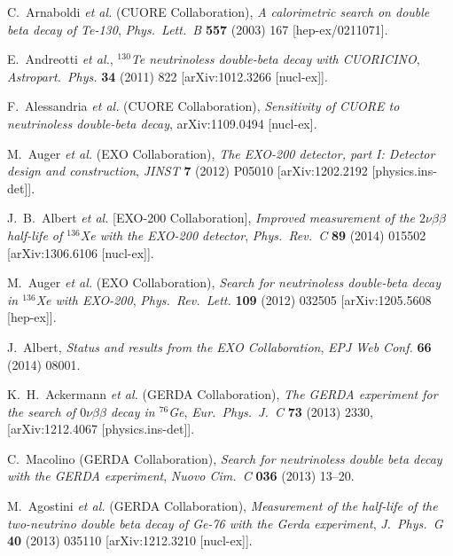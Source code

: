 \documentclass{PoS}
\begin{document}
\begin{thebibliography}{99}
   C.~Arnaboldi {\it et al.} (CUORE Collaboration),
   \emph{A calorimetric search on double beta decay of Te-130},
   \emph{Phys.\ Lett.\ B} {\bf 557} (2003) 167
   [hep-ex/0211071].

   E.~Andreotti {\it et al.},
   \emph{$^{130}$Te neutrinoless double-beta decay with CUORICINO},
   \emph{Astropart.\ Phys.} {\bf 34} (2011) 822
   [arXiv:1012.3266 [nucl-ex]].

   F.~Alessandria {\it et al.} (CUORE Collaboration),
   \emph{Sensitivity of CUORE to neutrinoless double-beta decay},
   arXiv:1109.0494 [nucl-ex].

   M.~Auger {\it et al.} (EXO Collaboration),
   \emph{The EXO-200 detector, part I: Detector design and construction},
   \emph{JINST} {\bf 7} (2012) P05010
   [arXiv:1202.2192 [physics.ins-det]].

   J.~B.~Albert {\it et al.}  [EXO-200 Collaboration],
   \emph{Improved measurement of the $2\nu\beta\beta$ half-life of $^{136}$Xe with the EXO-200 detector},
   \emph{Phys.\ Rev.\ C} {\bf 89} (2014) 015502
   [arXiv:1306.6106 [nucl-ex]].

   M.~Auger {\it et al.} (EXO Collaboration),
   \emph{Search for neutrinoless double-beta decay in $^{136}$Xe with EXO-200},
   \emph{Phys.\ Rev.\ Lett.} {\bf 109} (2012) 032505
   [arXiv:1205.5608 [hep-ex]].

   J.~Albert,
   \emph{Status and results from the EXO Collaboration},
   \emph{EPJ Web Conf.} {\bf 66} (2014) 08001.

  K.~H.~Ackermann {\it et al.} (GERDA Collaboration),
   \emph{The GERDA experiment for the search of $0\nu\beta\beta$  decay in $^{76}$Ge},
   \emph{Eur.\ Phys.\ J.\ C} {\bf 73} (2013) 2330,
   [arXiv:1212.4067 [physics.ins-det]].

   C.~Macolino (GERDA Collaboration),
   \emph{Search for neutrinoless double beta decay with the GERDA experiment},
   \emph{Nuovo Cim.\ C} {\bf 036} (2013) 13--20.

   M.~Agostini {\it et al.} (GERDA Collaboration),
   \emph{Measurement of the half-life of the two-neutrino double beta decay of Ge-76 with the Gerda experiment},
   \emph{J.\ Phys.\ G} {\bf 40} (2013) 035110
   [arXiv:1212.3210 [nucl-ex]].


\end{thebibliography}
\end{document}
